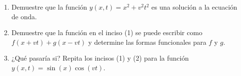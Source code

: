 \item \begin{enumerate}
    \item Demuestre que la función $y(x,t) = x^2 + v^2 t^2$ es una solución a la ecuación de onda.
    \item Demuestre que la función en el inciso (1) se puede escribir como $f(x + vt) + g(x - vt)$ y determine las formas funcionales para $f$ y $g$.
    \item ¿Qué pasaría si? Repita los incisos (1) y (2) para la función $y(x,t) = \sin(x) \cos(vt)$.
\end{enumerate}
